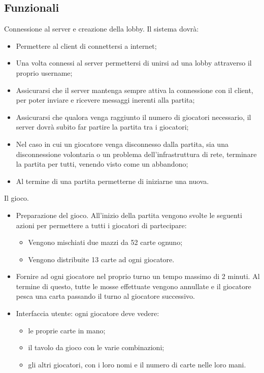 \subsection{Funzionali}
Connessione al server e creazione della lobby.
Il sistema dovrà:
\begin{itemize}
    \item Permettere al client di connettersi a internet;
    \item Una volta connessi al server permettersi di unirsi ad una lobby attraverso il proprio username;
    \item Assicurarsi che il server mantenga sempre attiva la connessione con il client, per poter inviare e ricevere messaggi inerenti alla partita;
    \item Assicurarsi che qualora venga raggiunto il numero di giocatori necessario, il server dovrà subito far partire la partita tra i giocatori;
    \item Nel caso in cui un giocatore venga disconnesso dalla partita, sia una disconnessione volontaria o un problema dell’infrastruttura di rete, terminare la partita per tutti, venendo visto come un abbandono;
    \item Al termine di una partita permetterne di iniziarne una nuova.
\end{itemize}
Il gioco.
\begin{itemize}
    \item Preparazione del gioco.
    All’inizio della partita vengono svolte le seguenti azioni per permettere a tutti i giocatori di partecipare:
    \begin{itemize}
        \item Vengono mischiati due mazzi da 52 carte ognuno;
        \item Vengono distribuite 13 carte ad ogni giocatore.
    \end{itemize}
    \item Fornire ad ogni giocatore nel proprio turno un tempo massimo di 2 minuti.
    Al termine di questo, tutte le mosse effettuate vengono annullate e il giocatore pesca una carta passando il turno al giocatore successivo.
    \item Interfaccia utente: ogni giocatore deve vedere:
    \begin{itemize}
        \item le proprie carte in mano;
        \item il tavolo da gioco con le varie combinazioni;
        \item gli altri giocatori, con i loro nomi e il numero di carte nelle loro mani.
    \end{itemize}
\end{itemize}

